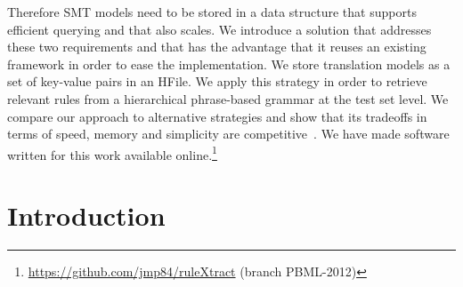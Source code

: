 Therefore SMT models need to be stored in a data structure
that supports efficient querying and that also scales. We introduce a solution
that addresses these two requirements and that has the advantage that
it reuses an existing framework in order to ease the implementation.
We store translation models as a set of key-value pairs in an HFile. We apply this
strategy in order to retrieve relevant rules
from a hierarchical phrase-based grammar at the test set level. We compare our
approach to alternative strategies and show that its tradeoffs in terms
of speed, memory and simplicity are
competitive~\citep{pino-waite-byrne:2012:PBML}. We have made software written
for this work
available online.\footnote{\url{https://github.com/jmp84/ruleXtract} (branch PBML-2012)}

\section{Introduction}
\label{sec:hfileIntro}

